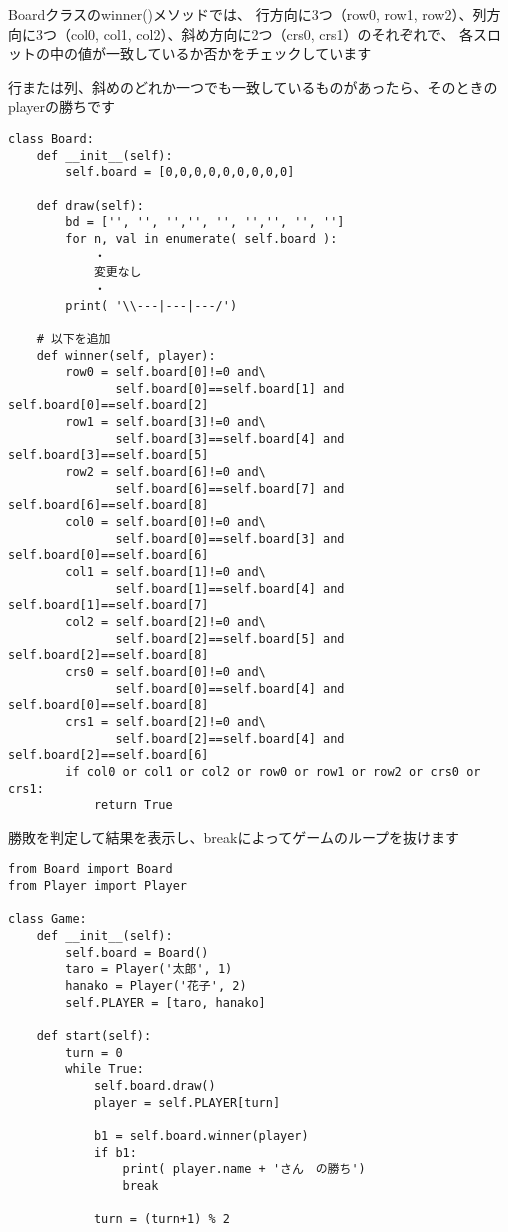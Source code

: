 \documentclass[uplatex,a4paper,11pt,oneside,openany]{jsbook}
\begin{document}
Boardクラスのwinner()メソッドでは、
行方向に3つ（row0, row1, row2）、列方向に3つ（col0, col1, col2）、斜め方向に2つ（crs0, crs1）のそれぞれで、
各スロットの中の値が一致しているか否かをチェックしています

行または列、斜めのどれか一つでも一致しているものがあったら、そのときのplayerの勝ちです

\begin{lstlisting}[caption=class Board,label=prog03-5]
class Board:
    def __init__(self):
        self.board = [0,0,0,0,0,0,0,0,0]

    def draw(self):
        bd = ['', '', '','', '', '','', '', '']
        for n, val in enumerate( self.board ):
            ・
            変更なし
            ・
        print( '\\---|---|---/')

    # 以下を追加
    def winner(self, player):
        row0 = self.board[0]!=0 and\
               self.board[0]==self.board[1] and self.board[0]==self.board[2]
        row1 = self.board[3]!=0 and\
               self.board[3]==self.board[4] and self.board[3]==self.board[5]
        row2 = self.board[6]!=0 and\
               self.board[6]==self.board[7] and self.board[6]==self.board[8]
        col0 = self.board[0]!=0 and\
               self.board[0]==self.board[3] and self.board[0]==self.board[6]
        col1 = self.board[1]!=0 and\
               self.board[1]==self.board[4] and self.board[1]==self.board[7]
        col2 = self.board[2]!=0 and\
               self.board[2]==self.board[5] and self.board[2]==self.board[8]
        crs0 = self.board[0]!=0 and\
               self.board[0]==self.board[4] and self.board[0]==self.board[8]
        crs1 = self.board[2]!=0 and\
               self.board[2]==self.board[4] and self.board[2]==self.board[6]
        if col0 or col1 or col2 or row0 or row1 or row2 or crs0 or crs1:
            return True
\end{lstlisting}%

勝敗を判定して結果を表示し、breakによってゲームのループを抜けます

\begin{lstlisting}[caption=class Game,label=prog03-6]
from Board import Board
from Player import Player

class Game:
    def __init__(self):
        self.board = Board()
        taro = Player('太郎', 1)
        hanako = Player('花子', 2)
        self.PLAYER = [taro, hanako]

    def start(self):
        turn = 0
        while True:
            self.board.draw()
            player = self.PLAYER[turn]

            b1 = self.board.winner(player)
            if b1:
                print( player.name + 'さん　の勝ち')
                break

            turn = (turn+1) % 2
\end{lstlisting}%
\end{document}
